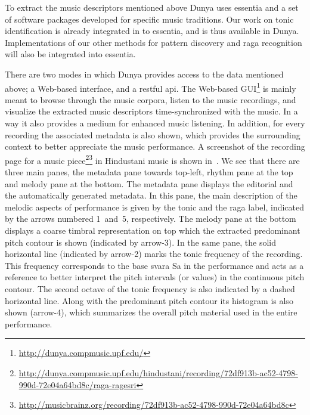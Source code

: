 To extract the music descriptors mentioned above Dunya uses \gls{essentia} and a set of software packages developed for specific music traditions. Our work on tonic identification is already integrated in to \gls{essentia}, and is thus available in Dunya. Implementations of our other methods for pattern discovery and \gls{raga} recognition will also be integrated into \gls{essentia}. 

There are two modes in which Dunya provides access to the data mentioned above; a Web-based interface, and a restful \acrshort{api}. The Web-based GUI\footnote{\url{http://dunya.compmusic.upf.edu/}} is mainly meant to browse through the music corpora, listen to the music recordings, and visualize the extracted music descriptors time-synchronized with the music. In a way it also provides a medium for enhanced music listening. In addition, for every recording the associated metadata is also shown, which provides the surrounding context to better appreciate the music performance. A screenshot of the recording page for a music piece\footnote{\url{http://dunya.compmusic.upf.edu/hindustani/recording/72df913b-ac52-4798-990d-72e04a64bd8c/raga-ragesri}}\footnote{\url{http://musicbrainz.org/recording/72df913b-ac52-4798-990d-72e04a64bd8c}} in Hindustani music is shown in~. We see that there are three main panes, the metadata pane towards top-left, rhythm pane at the top and melody pane at the bottom. The metadata pane displays the editorial and the automatically generated metadata. In this pane, the main description of the melodic aspects of performance is given by the tonic and the \gls{raga} label, indicated by the arrows numbered 1~and~5, respectively. The melody pane at the bottom displays a coarse timbral representation on top which the extracted predominant pitch contour is shown (indicated by arrow-3).  In the same pane, the solid horizontal line (indicated by arrow-2) marks the tonic frequency of the recording. This frequency corresponds to the base \gls{svara} Sa in the performance and acts as a reference to better interpret the pitch intervals (or values) in the continuous pitch contour. The second octave of the tonic frequency is also indicated by a dashed horizontal line. Along with the predominant pitch contour its histogram is also shown (arrow-4), which summarizes the overall pitch material used in the entire performance. 


